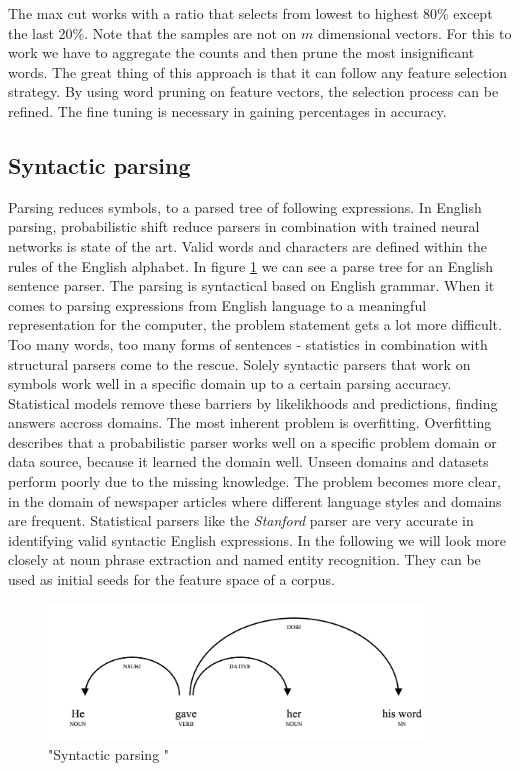     The max cut works with a ratio that selects from lowest to highest 80\% except the last 20\%. Note that the samples are not on $m$ dimensional vectors. For this to work we have to aggregate the counts and then prune the most insignificant words. The great thing of this approach is that it can follow any feature selection strategy. By using word pruning on feature vectors, the selection process can be refined. The fine tuning is necessary in gaining percentages in accuracy.

  \subsection{Syntactic parsing}
  \label{sec:syntactic_parsing}

  Parsing reduces symbols, to a parsed tree of following expressions. In English parsing, probabilistic shift reduce parsers in combination with trained neural networks is state of the art. \cite[Stanford, Spacy]{Nothing} Valid words and characters are defined within the rules of the English alphabet. In figure \ref{syntactic_parsing} we can see a parse tree for an English sentence parser. The parsing is syntactical based on English grammar. When it comes to parsing expressions from English language to a meaningful representation for the computer, the problem statement gets a lot more difficult. Too many words, too many forms of sentences - statistics in combination with structural parsers come to the rescue. Solely syntactic parsers that work on symbols work well in a specific domain up to a certain parsing accuracy. Statistical models remove these barriers by likelikhoods and predictions, finding answers accross domains. The most inherent problem is overfitting. Overfitting describes that a probabilistic parser works well on a specific problem domain or data source, because it learned the domain well. Unseen domains and datasets perform poorly due to the missing knowledge. The problem becomes more clear, in the domain of newspaper articles where different language styles and domains are frequent. Statistical parsers like the \emph{Stanford} parser are very accurate in identifying valid syntactic English expressions. In the following we will look more closely at noun phrase extraction and named entity recognition. They can be used as initial seeds for the feature space of a corpus.

    \begin{figure}[h!]
      \centering
        \includegraphics[width=0.9\textwidth]{sentence_structure.png}
        \caption{"Syntactic parsing \cite[Spacy]{Nothing}"}
        \label{syntactic_parsing}
    \end{figure} 

